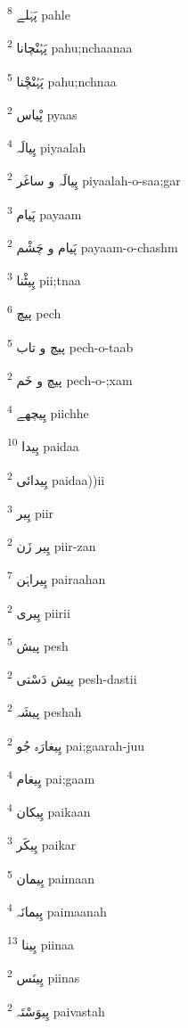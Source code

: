 \documentclass[12pt]{article}
\begin{document}
\begin{RTL}
\begin{multicols}{5}
{\ur پَہْلے}   \textsuperscript{8} pahle

{\ur پَہُنْچانا}   \textsuperscript{2} pahu;nchaanaa

{\ur پَہُنْچْنا}   \textsuperscript{5} pahu;nchnaa

{\ur پْیاس}   \textsuperscript{2} pyaas

{\ur پِیالَہ}   \textsuperscript{4} piyaalah

{\ur پِیالَہ و ساغَر}   \textsuperscript{2} piyaalah-o-saa;gar

{\ur پَیام}   \textsuperscript{3} payaam

{\ur پَیام و چَشْم}   \textsuperscript{2} payaam-o-chashm

{\ur پِیٹْنا}   \textsuperscript{3} pii;tnaa

{\ur پیچ}   \textsuperscript{6} pech

{\ur پیچ و تاب}   \textsuperscript{5} pech-o-taab

{\ur پیچ و خَم}   \textsuperscript{2} pech-o-;xam

{\ur پِیچھے}   \textsuperscript{4} piichhe

{\ur پِیدا}   \textsuperscript{10} paidaa

{\ur پِیدائی}   \textsuperscript{2} paidaa))ii

{\ur پِیر}   \textsuperscript{3} piir

{\ur پِیر زَن}   \textsuperscript{2} piir-zan

{\ur پِیراہَن}   \textsuperscript{7} pairaahan

{\ur پِیری}   \textsuperscript{2} piirii

{\ur پیش}   \textsuperscript{5} pesh

{\ur پیش دَسْتی}   \textsuperscript{2} pesh-dastii

{\ur پیشَہ}   \textsuperscript{2} peshah

{\ur پِیغارَہ جُو}   \textsuperscript{2} pai;gaarah-juu

{\ur پِیغام}   \textsuperscript{4} pai;gaam

{\ur پِیکان}   \textsuperscript{4} paikaan

{\ur پِیکَر}   \textsuperscript{3} paikar

{\ur پِیمان}   \textsuperscript{5} paimaan

{\ur پِیمانَہ}   \textsuperscript{4} paimaanah

{\ur پِینا}   \textsuperscript{13} piinaa

{\ur پِینَس}   \textsuperscript{2} piinas

{\ur پِیوَسْتَہ}   \textsuperscript{2} paivastah


\end{multicols}
\end{RTL}
\end{document}
